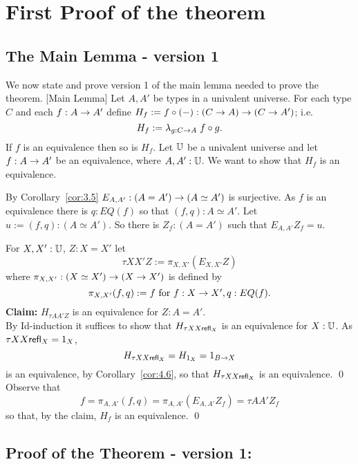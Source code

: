 \section{First Proof of the theorem}


\subsection{ The Main Lemma - version 1}

We now state and  prove version 1 of the main lemma needed to prove the theorem.
[Main Lemma]\label{fe:lem-main1}\label{lem:5.1}
Let $A,A'$ be types in a univalent universe.  For each type $C$ and each
$f:A\rightarrow A'$ define $H_f := f\circ(-): (C\rightarrow A)\rightarrow (C\rightarrow A')$; i.e.
  \[ H_f := \lambda_{g:C\rightarrow A}\;  f\circ g.\]
If $f$ is an equivalence then so is $H_f$.
\proof Let $\mathbb{U}$ be a univalent universe and let $f:A\rightarrow A'$ be an equivalence, where $A,A':\mathbb{U}$.  We want to show that $H_f$ is an equivalence.

By Corollary~\ref{cor:3.5} $E_{A,A'}:(A=A')\rightarrow (A\simeq A')$ is surjective.  
As $f$ is an equivalence there is $q:EQ(f)$ so that $(f,q):A\simeq A'$. Let $u:=(f,q):(A\simeq A')$.  So there is $Z_f:(A=A')$ such that $E_{A,A'}Z_f = u$.

\item[Proof that $H_f$ is an equivalence:]
For $X,X':\mathbb{U}$, $Z:X=X'$ let 
  \[\tau X X' Z:= \pi_{X,X'}( E_{X,X'}Z)\]
where $\pi_{X,X'}:(X\simeq X')\rightarrow (X\rightarrow X')$ is defined by
  \[ \pi_{X,X'}(f,q):= f\mbox{ for $f:X\rightarrow X',q:EQ(f)$}.\]
{\bf Claim:} $H_{\tau A A' Z}$ is an equivalence for $Z:A=A'$.\\
\proof By Id-induction it suffices to show that $H_{\tau X X \mathsf{refl}_{X}}$ is an equivalence for $X:\mathbb{U}$.  As $\tau X X\mathsf{refl}_{X}=1_X$,
  \[ H_{\tau X X\mathsf{refl}_{X}} = H_{1_X}=1_{B\rightarrow X}\]
is an equivalence, by Corollary~\ref{cor:4.6}, so that 
$H_{\tau X X \mathsf{refl}_{X}}$ is an equivalence.
\qed
{}
Observe that
  \[ f = \pi_{A,A'}(f,q)=\pi_{A,A'}(E_{A,A'}Z_f)=\tau A A' Z_f\]
so that, by the claim, $H_f$ is an equivalence.
\qed

\subsection{Proof of the Theorem - version 1: } 

